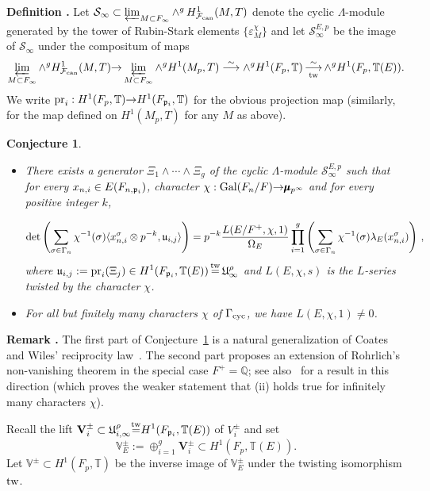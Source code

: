 \documentclass[12pt]{amsart}
\numberwithin{equation}{section}
\newenvironment{define}{\par\medskip\noindent\refstepcounter{thm}
\bgroup{\hspace*{-0.15 cm}\bf{Definition}
\thethm.}\bgroup}{\egroup \egroup\par\medskip}
\newtheorem{conj}[thm]{Conjecture}
\newenvironment{rem}{\par\medskip\noindent\refstepcounter{thm}
\bgroup{\hspace*{-0.15 cm}\bf{Remark} \thethm.}\bgroup}{\egroup
\egroup\par\medskip} \parskip 2pt
\begin{document}
\begin{define}
\label{def:moduleofRSelements}
Let $\mathcal{S}_\infty \subset \varprojlim_{M\subset F_\infty}\wedge^g\, H^1_{\mathcal{F}_{\textup{\lowercase{can}}}}(M,T)$ denote the cyclic ${\Lambda}$-module generated by the tower of Rubin-Stark elements $\{\varepsilon_{M}^\chi\}$ and let $\mathcal{S}^{E,p}_{\infty}$ be the image of $\mathcal{S}_\infty$ under the compositum of maps
$$\varprojlim_{M\subset F_\infty} \wedge^g  H^1_{\mathcal{F}_{\textup{\lowercase{can}}}}(M,T){\rightarrow} \varprojlim_{M\subset F_\infty} \wedge^g  H^1(M_p,T)\stackrel{\sim}{\longrightarrow} \wedge^g H^1(F_p,{\mathbb{T}})\mathop{\longrightarrow}^{\sim}_{\textup{tw}} \wedge^g H^1(F_p,{\mathbb{T}}(E)).$$
We write $\textup{pr}_i: H^1(F_p,{\mathbb{T}}) {\rightarrow} H^1(F_{\frak{p}_i},{\mathbb{T}})$ for the obvious projection map (similarly, for the map defined on $H^1(M_p,T)$ for any $M$ as above).
\end{define}
\begin{conj} $\,$
\label{conj:reciprocity}
\begin{itemize}
\item[(i)] There exists a generator ${\Xi}_1\wedge\cdots\wedge{\Xi}_g$ of the cyclic ${\Lambda}$-module $\mathcal{S}^{E,p}_{\infty}$ such that for every $x_{n,i} \in E(F_{n,\frak{p}_i})$, character $\chi:\textup{Gal}(F_n/F){\rightarrow} \pmb{\mu}_{p^\infty}$ and for every positive integer $k$,

$$\det\left(\sum_{\sigma\in \Gamma_n}\chi^{-1}(\sigma)\langle x_{n,i}^\sigma\otimes p^{-k},\frak{u}_{i,j}\rangle\right)=p^{-k}\frac{L(E/F^+,\chi,1)}{\Omega_E}\prod_{i=1}^g\left(\sum_{\sigma\in\Gamma_n}\chi^{-1}(\sigma)\lambda_E(x_{n,i}^\sigma)\right)\,,$$
where 
$\displaystyle{\frak{u}_{i,j}:=\textup{pr}_{i}({\Xi}_j) \in H^1(F_{\frak{p}_i},{\mathbb{T}}(E))\mathop{=}^{\textup{tw}} \frak{U}_{\infty}^\rho}$ 
and $L(E,\chi,s)$ is the $L$-series twisted by the character $\chi$.
\item[(ii)] For all but finitely many characters $\chi$ of $\Gamma_{\textup{cyc}}$, we have $L(E,\chi,1)\neq0$.
\end{itemize}
\end{conj}
\begin{rem}
The first part of Conjecture~\ref{conj:reciprocity} is a natural generalization of Coates and Wiles' reciprocity law~\cite{coateswiles77,wiles78reciprocity}. The second part proposes an extension of Rohrlich's \cite{rohrlich84cyclo} non-vanishing theorem in the special case $F^+={\mathbb{Q}}$; see also~\cite{rohrlich89} for a result in this direction (which proves the weaker statement that (ii) holds true for infinitely many characters $\chi$).
\end{rem}
Recall the lift $\mathbf{V}^{\pm}_i\subset \frak{U}^\rho_{i,\infty}\displaystyle{\mathop{=}^{\textup{tw}}}H^1(F_{\frak{p}_i},{\mathbb{T}}(E))$ of $V^\pm_{i}$ and set $$\mathbb{V}_{E}^\pm:=\oplus_{i=1}^g \mathbf{V}^{\pm}_i \subset H^1(F_p,{\mathbb{T}}(E)).$$
Let $\mathbb{V}^\pm \subset H^1(F_p,{\mathbb{T}})$ be the inverse image of $\mathbb{V}_{E}^\pm$ under the twisting isomorphism $\textup{tw}$.
\end{document}
